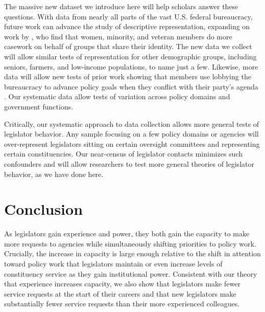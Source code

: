 \documentclass[12pt]{article}
\begin{document}
The massive new dataset we introduce here will help scholars answer these questions. With data from nearly all parts of the vast U.S. federal bureaucracy, future work can advance the study of descriptive representation, expanding on work by \citet{LowandeRitchieLauterbach2018}, who find that women, minority, and veteran members do more casework on behalf of groups that share their identity. The new data we collect will allow similar tests of representation for other demographic groups, including seniors, farmers, and low-income populations, to name just a few. Likewise, more data will allow new tests of prior work showing that members use lobbying the bureaucracy to advance policy goals when they conflict with their party's agenda \citep{Ritchie2017}. Our systematic data allow tests of variation across policy domains and government functions. 

Critically, our systematic approach to data collection allows more general tests of legislator behavior. Any sample focusing on a few policy domains or agencies will over-represent legislators sitting on certain oversight committees and representing certain constituencies. Our near-census of legislator contacts minimizes such confounders and will allow researchers to test more general theories of legislator behavior, as we have done here.

\section{Conclusion} \label{s:conclude}

As legislators gain experience and power, they both gain the capacity to make more requests to agencies while simultaneously shifting priorities to policy work. Crucially, the increase in capacity is large enough relative to the shift in attention toward policy work that legislators maintain or even increase levels of constituency service as they gain institutional power. Consistent with our theory that experience increases capacity, we also show that legislators make fewer service requests at the start of their careers and that new legislators make substantially fewer service requests than their more experienced colleagues. 
\end{document}
